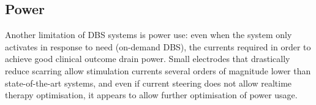 \documentclass[10pt,letterpaper]{article}
\begin{document}
\subsection{Power}

Another limitation of DBS systems is power use: even when the system
only activates in response to need (on-demand DBS), the currents
required in order to achieve good clinical outcome drain power.  Small
electrodes that drastically reduce scarring allow stimulation currents
several orders of magnitude lower than state-of-the-art systems, and
even if current steering does not allow realtime therapy optimisation,
it appears to allow further optimisation of power usage.





\end{document}
